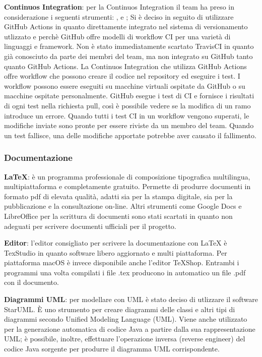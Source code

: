 \begin{description}
\item{\textbf{Continuos Integration}}:  per la Continuos Integration il team ha preso in considerazione i seguenti strumenti: ,  e ;
Si è deciso in seguito di utilizzare GitHub Actions in quanto direttamente integrato nel sistema di versionamento utlizzato e perchè 
GitHub offre modelli di workflow CI per una varietà di linguaggi e framework.
Non è stato immediatamente scartato TravisCI in quanto già conosciuto da parte dei membri del team, ma non integrato su GitHub tanto quanto GitHub Actions.
La Continuos Integration che utilizza GitHub Actions offre workflow che possono creare il codice nel repository ed eseguire i test. 
I workflow possono essere eseguiti su macchine virtuali ospitate da GitHub o su macchine ospitate personalmente.
GitHub esegue i test di CI e fornisce i risultati di ogni test nella richiesta pull, così è possibile vedere se la modifica di un ramo introduce un errore. 
Quando tutti i test CI in un workflow vengono superati, le modifiche inviate sono pronte per essere riviste da un membro del team. 
Quando un test fallisce, una delle modifiche apportate potrebbe aver causato il fallimento. 

\end{description}

\subsubsection{Documentazione} 
\begin{description}
\item{\textbf{\LaTeX}}: è un programma professionale di composizione tipografica multilingua,
multipiattaforma e completamente gratuito. Permette di produrre documenti in formato pdf di elevata qualità, adatti sia per la stampa digitale, sia
per la pubblicazione e la consultazione on-line. 
Altri strumenti come Google Docs e LibreOffice per la scrittura di documenti sono stati scartati in quanto non adeguati per scrivere documenti ufficiali per il progetto.

\item{\textbf{Editor}}: l’editor  consigliato  per  scrivere  la  documentazione  con  {\LaTeX}  è TexStudio  in  quanto  software  libero  aggiornato  e  multi  piattaforma. Per piattaforma macOS è invece disponibile
anche l'editor TeXShop. Entrambi i programmi una volta compilati i file .tex producono in automatico un file .pdf con il documento.

\item{\textbf{Diagrammi UML}}: per modellare con UML è stato deciso di utlizzare il software StarUML. È uno strumento per creare diagrammi delle classi e altri tipi di diagrammi secondo Unified Modeling Language (UML). 
Viene anche utilizzato per la generazione automatica di codice Java a partire dalla sua rappresentazione UML; è possibile, inoltre, effettuare l’operazione inversa (reverse engineer) del codice Java sorgente per produrre il diagramma UML corrispondente. 
\end{description}

